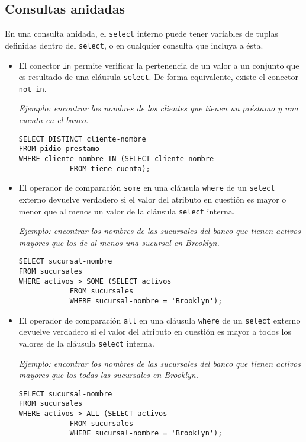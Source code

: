 \documentclass[a4paper, twoside]{article}
\begin{document}
\subsection{Consultas anidadas}
En una consulta anidada, el \texttt{select} interno puede tener variables de tuplas definidas dentro del \texttt{select}, o en cualquier consulta que incluya a ésta.
\begin{itemize}
	\item El conector \texttt{in} permite verificar la pertenencia de un valor a un conjunto que es resultado de una cláusula \texttt{select}. De forma equivalente, existe el conector \texttt{not in}.

	\emph{Ejemplo: encontrar los nombres de los clientes que tienen un préstamo y una cuenta en el banco.}

	\begin{lstlisting}
SELECT DISTINCT cliente-nombre
FROM pidio-prestamo
WHERE cliente-nombre IN (SELECT cliente-nombre
			FROM tiene-cuenta);
	\end{lstlisting}

	\item El operador de comparación \texttt{some} en una cláusula \texttt{where} de un \texttt{select} externo devuelve verdadero si el valor del atributo en cuestión es mayor o menor que al menos un valor de la cláusula
\texttt{select} interna.

	\emph{Ejemplo: encontrar los nombres de las sucursales del banco que tienen activos mayores que los de al menos una sucursal en Brooklyn.}

	\begin{lstlisting}
SELECT sucursal-nombre
FROM sucursales
WHERE activos > SOME (SELECT activos
			FROM sucursales
			WHERE sucursal-nombre = 'Brooklyn');
	\end{lstlisting}

	\item El operador de comparación \texttt{all} en una cláusula \texttt{where} de un \texttt{select} externo devuelve verdadero si el valor del atributo en cuestión es mayor a todos los valores de la cláusula \texttt{select}
interna.

	\emph{Ejemplo: encontrar los nombres de las sucursales del banco que tienen activos mayores que los todas las sucursales en Brooklyn.}

	\begin{lstlisting}
SELECT sucursal-nombre
FROM sucursales
WHERE activos > ALL (SELECT activos
			FROM sucursales
			WHERE sucursal-nombre = 'Brooklyn');
	\end{lstlisting}


\end{itemize}
\end{document}
